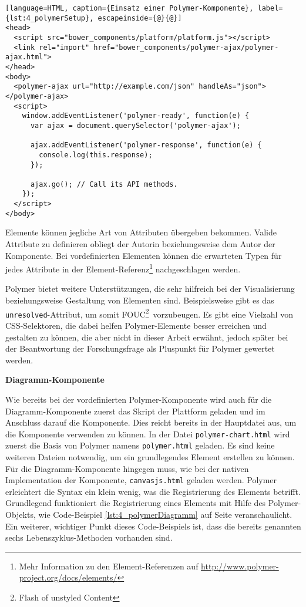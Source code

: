\begin{lstlisting}[language=HTML, caption={Einsatz einer Polymer-Komponente}, label={lst:4_polymerSetup}, escapeinside={@}{@}]
<head>
  <script src="bower_components/platform/platform.js"></script>
  <link rel="import" href="bower_components/polymer-ajax/polymer-ajax.html">
</head>
<body>
  <polymer-ajax url="http://example.com/json" handleAs="json"></polymer-ajax>
  <script>
    window.addEventListener('polymer-ready', function(e) {
      var ajax = document.querySelector('polymer-ajax');

      ajax.addEventListener('polymer-response', function(e) {
        console.log(this.response);
      });

      ajax.go(); // Call its API methods.
    });
  </script>
</body>
\end{lstlisting}

Elemente können jegliche Art von Attributen übergeben bekommen. Valide Attribute zu definieren obliegt der Autorin beziehungsweise dem Autor der Komponente. Bei vordefinierten Elementen können die erwarteten Typen für jedes Attribute in der Element-Referenz\footnote{Mehr Information zu den Element-Referenzen auf \url{http://www.polymer-project.org/docs/elements/}} nachgeschlagen werden.

Polymer bietet weitere Unterstützungen, die sehr hilfreich bei der Visualisierung beziehungsweise Gestaltung von Elementen sind. Beispielsweise gibt es das \lstinline|unresolved|-Attribut, um somit \glqq FOUC\footnote{Flash of unstyled Content}\grqq\ vorzubeugen. Es gibt eine Vielzahl von CSS-Selektoren, die dabei helfen Polymer-Elemente besser erreichen und gestalten zu können, die aber nicht in dieser Arbeit erwähnt, jedoch später bei der Beantwortung der Forschungsfrage als Pluspunkt für Polymer gewertet werden.

\textbf{Diagramm-Komponente}

Wie bereits bei der vordefinierten Polymer-Komponente wird auch für die Diagramm-Komponente zuerst das Skript der Plattform geladen und im Anschluss darauf die Komponente. Dies reicht bereits in der Hauptdatei aus, um die Komponente verwenden zu können. In der Datei \lstinline|polymer-chart.html| wird zuerst die Basis von Polymer namens \lstinline|polymer.html| geladen. Es sind keine weiteren Dateien notwendig, um ein grundlegendes Element erstellen zu können. Für die Diagramm-Komponente hingegen muss, wie bei der nativen Implementation der Komponente, \lstinline|canvasjs.html| geladen werden. Polymer erleichtert die Syntax ein klein wenig, was die Registrierung des Elements betrifft. Grundlegend funktioniert die Registrierung eines Elements mit Hilfe des Polymer-Objekts, wie Code-Beispiel \ref{lst:4_polymerDiagramm} auf Seite \pageref{lst:4_polymerDiagramm} veranschaulicht. Ein weiterer, wichtiger Punkt dieses Code-Beispiels ist, dass die bereits genannten sechs Lebenszyklus-Methoden vorhanden sind.

